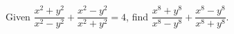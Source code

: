 Given $\dfrac{x^2+y^2}{x^2-y^2}+\dfrac{x^2-y^2}{x^2+y^2}=4$, find $\dfrac{x^8+y^8}{x^8-y^8}+\dfrac{x^8-y^8}{x^8+y^8}$.
